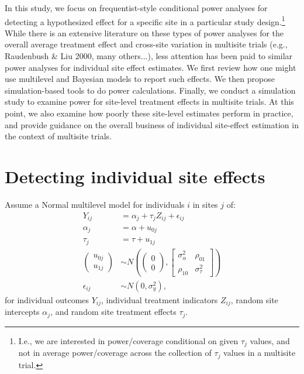 \documentclass[]{article}
\begin{document}
In this study, we focus on frequentist-style conditional power analyses for detecting a hypothesized effect for a specific site in a particular study design.\footnote{I.e., we are interested in power/coverage conditional on given $\tau_j$ values, and not in average power/coverage across the collection of $\tau_j$ values in a multisite trial.}
While there is an extensive literature on these types of power analyses for the overall average treatment effect and cross-site variation in multisite trials (e.g., Raudenbush \& Liu 2000, many others...), less attention has been paid to similar power analyses for individual site effect estimates.
We first review how one might use multilevel and Bayesian models to report such effects.
We then propose simulation-based tools to do power calculations.
Finally, we conduct a simulation study to examine power for site-level treatment effects in multisite trials.
At this point, we also examine how poorly these site-level estimates perform in practice, and provide guidance on the overall business of individual site-effect estimation in the context of multisite trials.


\section{Detecting individual site effects}

Assume a Normal multilevel model for individuals $i$ in sites $j$ of: 
\begin{align*}
	Y_{ij} &= \alpha_j + \tau_j Z_{ij} + \epsilon_{ij} \\
	\alpha_j &= \alpha + u_{0j} \\
	\tau_j &= \tau + u_{1j} \\
	\begin{pmatrix}
		u_{0j} \\ u_{1j}
	\end{pmatrix} &\sim N\left(
	\begin{pmatrix}
		0 \\ 0
	\end{pmatrix}, 
	\begin{bmatrix}
		\sigma^2_\alpha & \rho_{01} \\ \rho_{10} & \sigma^2_\tau
	\end{bmatrix}\right) \\
	\epsilon_{ij} &\sim N(0, \sigma^2_y) ,
\end{align*}
for individual outcomes $Y_{ij}$, individual treatment indicators $Z_{ij}$, random site intercepts $\alpha_j$, and random site treatment effects $\tau_j$.
\end{document}
